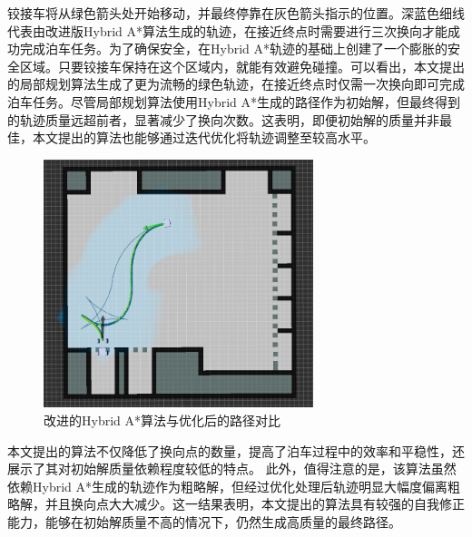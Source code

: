 \documentclass[master,academic]{ysuthesis} %
\begin{document}
		铰接车将从绿色箭头处开始移动，并最终停靠在灰色箭头指示的位置。深蓝色细线代表由改进版Hybrid A*算法生成的轨迹，在接近终点时需要进行三次换向才能成功完成泊车任务。为了确保安全，在Hybrid A*轨迹的基础上创建了一个膨胀的安全区域。只要铰接车保持在这个区域内，就能有效避免碰撞。可以看出，本文提出的局部规划算法生成了更为流畅的绿色轨迹，在接近终点时仅需一次换向即可完成泊车任务。尽管局部规划算法使用Hybrid A*生成的路径作为初始解，但最终得到的轨迹质量远超前者，显著减少了换向次数。这表明，即便初始解的质量并非最佳，本文提出的算法也能够通过迭代优化将轨迹调整至较高水平。
		\begin{figure}[H]
			\centering
			\includegraphics[width=0.7\textwidth]{boche.png}
			\caption{改进的Hybrid A*算法与优化后的路径对比}
			\label{fig:boche}
		\end{figure}

		本文提出的算法不仅降低了换向点的数量，提高了泊车过程中的效率和平稳性，还展示了其对初始解质量依赖程度较低的特点。
		此外，值得注意的是，该算法虽然依赖Hybrid A*生成的轨迹作为粗略解，但经过优化处理后轨迹明显大幅度偏离粗略解，并且换向点大大减少。这一结果表明，本文提出的算法具有较强的自我修正能力，能够在初始解质量不高的情况下，仍然生成高质量的最终路径。
\end{document}
